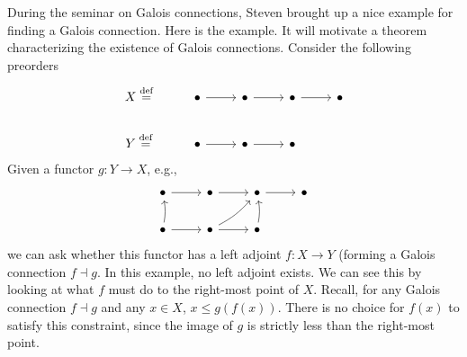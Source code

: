 \documentclass{../thesis-note}
\begin{document}
\begin{example}
  During the seminar on Galois connections, Steven brought up a nice example
  for finding a Galois connection. Here is the example. It will motivate a
  theorem characterizing the existence of Galois connections. Consider the
  following preorders
  \[%
    \begin{tikzcd}
      X \eqdef & \bullet \arrow[r] & \bullet \arrow[r] & \bullet \arrow[r] & \bullet\\
      Y \eqdef & \bullet \arrow[r] & \bullet \arrow[r] & \bullet
    \end{tikzcd}
  \]%
  Given a functor \(g : Y \to X\), e.g.,
  \[%
    \begin{tikzcd}
      \bullet \arrow[r] & \bullet \arrow[r] & \bullet \arrow[r] & \bullet\\
      \bullet \arrow[u,bend right=10] \arrow[r] & \bullet \arrow[ur, bend
      right=10] \arrow[r] & \bullet
      \arrow[u, bend right=10]
    \end{tikzcd}
  \]%
  we can ask whether this functor has a left adjoint \(f: X \to Y\) (forming a
  Galois connection \(f \dashv g\). In this example, no left adjoint exists. We
  can see this by looking at what \(f\) must do to the right-most point of
  \(X\). Recall, for any Galois connection \(f \dashv g\) and any \(x \in X\),
  \(x \leq g(f(x))\). There is no choice for \(f(x)\) to satisfy this
  constraint, since the image of \(g\) is strictly less than the right-most
  point.


\end{example}
\end{document}
